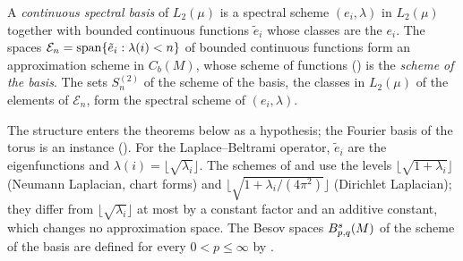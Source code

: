 \begin{definition}
\label{def:continuous-spectral-basis}
\leanok
{}
A \emph{continuous spectral basis} of $L_2(\mu)$ is a spectral scheme $(e_i, \lambda)$ in
$L_2(\mu)$ together with bounded continuous functions $\tilde e_i$ whose classes are the $e_i$.
The spaces $\mathcal{E}_n = \operatorname{span}\{\tilde e_i : \lambda(i) < n\}$ of bounded continuous functions
form an approximation scheme in $C_b(M)$, whose scheme of functions ()
is the \emph{scheme of the basis}. The sets $S^{(2)}_n$ of the scheme of the basis, the classes
in $L_2(\mu)$ of the elements of $\mathcal{E}_n$, form the spectral scheme of $(e_i, \lambda)$.
\end{definition}

The structure enters the theorems below as a hypothesis; the Fourier basis of the torus is an
instance (). For the Laplace--Beltrami operator, $\tilde e_i$ are
the eigenfunctions and $\lambda(i) = \lfloor \sqrt{\lambda_i} \rfloor$. The schemes of
 and  use the levels
$\lfloor \sqrt{1 + \lambda_i} \rfloor$ (Neumann Laplacian, chart forms) and
$\lfloor \sqrt{1 + \lambda_i/(4\pi^2)} \rfloor$ (Dirichlet Laplacian); they differ from
$\lfloor \sqrt{\lambda_i} \rfloor$ at most by a constant factor and an additive constant, which
changes no approximation space. The Besov spaces
$B^{s}_{p,q}(M)$ of the scheme of the basis are defined for every $0 < p \leq \infty$ by
.

